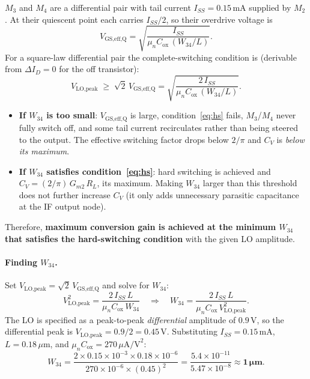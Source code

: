 $M_3$ and $M_4$ are a differential pair with tail current $I_{SS} = 0.15\,\text{mA}$
supplied by $M_2$.  At their quiescent point each carries $I_{SS}/2$, so
their overdrive voltage is
\[
  V_\text{GS,eff,Q}
    = \sqrt{\frac{I_{SS}}{\mu_n C_\text{ox}\,(W_{34}/L)}}.
\]
For a square-law differential pair the complete-switching condition is
(derivable from $\Delta I_D = 0$ for the off transistor):
\begin{equation}\label{eq:hs}
  V_\text{LO,peak} \;\geq\; \sqrt{2}\,V_\text{GS,eff,Q}
    = \sqrt{\frac{2\,I_{SS}}{\mu_n C_\text{ox}\,(W_{34}/L)}}.
\end{equation}
\begin{itemize}
  \item \textbf{If $W_{34}$ is too small}: $V_\text{GS,eff,Q}$ is large,
    condition~\eqref{eq:hs} fails, $M_3$/$M_4$ never fully switch off, and
    some tail current recirculates rather than being steered to the output.
    The effective switching factor drops below $2/\pi$ and $C_V$ is
    \emph{below its maximum}.
  \item \textbf{If $W_{34}$ satisfies condition~\eqref{eq:hs}}: hard
    switching is achieved and $C_V = (2/\pi)\,G_{m2}\,R_L$, its maximum.
    Making $W_{34}$ larger than this threshold does not further increase
    $C_V$ (it only adds unnecessary parasitic capacitance at the IF output
    node).
\end{itemize}
Therefore, \textbf{maximum conversion gain is achieved at the minimum $W_{34}$
that satisfies the hard-switching condition} with the given LO amplitude.

\paragraph{Finding $W_{34}$.}

Set $V_\text{LO,peak} = \sqrt{2}\,V_\text{GS,eff,Q}$ and solve for $W_{34}$:
\[
  V_\text{LO,peak}^2 = \frac{2\,I_{SS}\,L}{\mu_n C_\text{ox}\,W_{34}}
  \quad\Longrightarrow\quad
  \boxed{W_{34} = \frac{2\,I_{SS}\,L}{\mu_n C_\text{ox}\,V_\text{LO,peak}^2}.}
\]
The LO is specified as a peak-to-peak \emph{differential} amplitude of
$0.9\,\text{V}$, so the differential peak is
$V_\text{LO,peak} = 0.9/2 = 0.45\,\text{V}$.
Substituting $I_{SS} = 0.15\,\text{mA}$, $L = 0.18\,\mu\text{m}$, and
$\mu_n C_\text{ox} = 270\,\mu\text{A/V}^2$:
\[
  W_{34}
    = \frac{2\times0.15\times10^{-3}\times0.18\times10^{-6}}
           {270\times10^{-6}\times(0.45)^2}
    = \frac{5.4\times10^{-11}}{5.47\times10^{-8}}
    \approx \mathbf{1\,\mu\text{m}}.
\]

